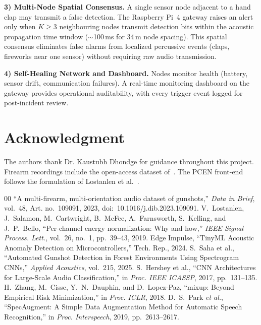 \documentclass[conference]{IEEEtran}
\begin{document}
\textbf{3) Multi-Node Spatial Consensus.} A single sensor node adjacent to a hand clap may transmit a false detection. The Raspberry Pi~4 gateway raises an alert only when $K \ge 3$ neighbouring nodes transmit detection bits within the acoustic propagation time window ($\sim$100\,ms for 34\,m node spacing). This spatial consensus eliminates false alarms from localized percussive events (claps, fireworks near one sensor) without requiring raw audio transmission.

\textbf{4) Self-Healing Network and Dashboard.} Nodes monitor health (battery, sensor drift, communication failures). A real-time monitoring dashboard on the gateway provides operational auditability, with every trigger event logged for post-incident review.

\section*{Acknowledgment}
The authors thank Dr. Kaustubh Dhondge for guidance throughout this project. Firearm recordings include the open-access dataset of~\cite{dib2023}. The PCEN front-end follows the formulation of Lostanlen et al.~\cite{lostanlen2019}.

\begin{thebibliography}{00}
 ``A multi-firearm, multi-orientation audio dataset of gunshots,'' \emph{Data in Brief}, vol.~48, Art. no.~109091, 2023, doi:~10.1016/j.dib.2023.109091.
 V.~Lostanlen, J.~Salamon, M.~Cartwright, B.~McFee, A.~Farnsworth, S.~Kelling, and J.~P.~Bello, ``Per-channel energy normalization: Why and how,'' \emph{IEEE Signal Process. Lett.}, vol.~26, no.~1, pp.~39--43, 2019.
 Edge Impulse, ``TinyML Acoustic Anomaly Detection on Microcontrollers,'' Tech. Rep., 2024.
 S.~Saha et al., ``Automated Gunshot Detection in Forest Environments Using Spectrogram CNNs,'' \emph{Applied Acoustics}, vol.~215, 2025.
 S.~Hershey et al., ``CNN Architectures for Large-Scale Audio Classification,'' in \emph{Proc. IEEE ICASSP}, 2017, pp.~131--135.
 H.~Zhang, M.~Cisse, Y.~N.~Dauphin, and D.~Lopez-Paz, ``mixup: Beyond Empirical Risk Minimization,'' in \emph{Proc. ICLR}, 2018.
 D.~S.~Park \emph{et al.}, ``SpecAugment: A Simple Data Augmentation Method for Automatic Speech Recognition,'' in \emph{Proc. Interspeech}, 2019, pp.~2613--2617.
\end{thebibliography}
\end{document}
